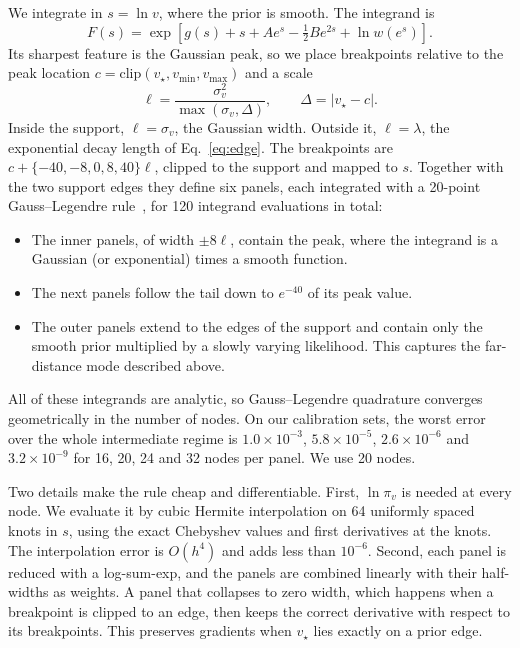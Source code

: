 \documentclass[prd,twocolumn,nofootinbib,superscriptaddress,amsmath,amssymb]{revtex4-2}
\newcommand{\vs}{v_\star}
\newcommand{\vmin}{v_{\min}}
\newcommand{\vmax}{v_{\max}}
\begin{document}
We integrate in $s=\ln v$,
where the prior is smooth.
The integrand is
\begin{equation}
F(s) = \exp\!\left[g(s) + s + A e^s - \tfrac12 B e^{2s} + \ln w(e^s)\right].
\end{equation}
Its sharpest feature is the Gaussian peak,
so we place breakpoints relative to the peak location $c=\mathrm{clip}(\vs,\vmin,\vmax)$ and a scale
\begin{equation}
\ell = \frac{\sigma_v^2}{\max(\sigma_v,\Delta)},\qquad \Delta = |\vs-c|.
\end{equation}
Inside the support,
$\ell=\sigma_v$,
the Gaussian width.
Outside it,
$\ell=\lambda$,
the exponential decay length of Eq.~\eqref{eq:edge}.
The breakpoints are $c+\{-40,-8,0,8,40\}\ell$,
clipped to the support and mapped to $s$.
Together with the two support edges they define six panels,
each integrated with a 20-point Gauss--Legendre rule~\cite{GolubWelsch1969},
for 120 integrand evaluations in total:
\begin{itemize}
\item The inner panels,
of width $\pm8\ell$,
contain the peak,
where the integrand is a Gaussian (or exponential) times a smooth function.
\item The next panels follow the tail down to $e^{-40}$ of its peak value.
\item The outer panels extend to the edges of the support and contain only the smooth prior multiplied by a slowly varying likelihood.
This captures the far-distance mode described above.
\end{itemize}
All of these integrands are analytic,
so Gauss--Legendre quadrature converges geometrically in the number of nodes.
On our calibration sets,
the worst error over the whole intermediate regime is $1.0\times10^{-3}$,
$5.8\times10^{-5}$,
$2.6\times10^{-6}$ and $3.2\times10^{-9}$ for 16,
20,
24 and 32 nodes per panel.
We use 20 nodes.

Two details make the rule cheap and differentiable.
First,
$\ln\pi_v$ is needed at every node.
We evaluate it by cubic Hermite interpolation on 64 uniformly spaced knots in $s$,
using the exact Chebyshev values and first derivatives at the knots.
The interpolation error is $O(h^4)$ and adds less than $10^{-6}$.
Second,
each panel is reduced with a log-sum-exp,
and the panels are combined linearly with their half-widths as weights.
A panel that collapses to zero width,
which happens when a breakpoint is clipped to an edge,
then keeps the correct derivative with respect to its breakpoints.
This preserves gradients when $\vs$ lies exactly on a prior edge.
\end{document}
